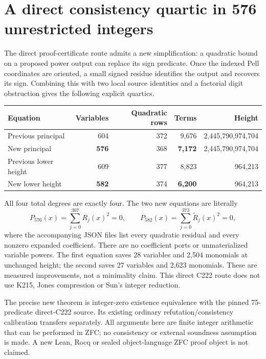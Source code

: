 \section{A direct consistency quartic in 576 unrestricted integers}
\label{sec:direct576}

The direct proof-certificate route admits a new simplification: a
quadratic bound on a proposed power output can replace its sign
predicate.  Once the indexed Pell coordinates are oriented, a small
signed residue identifies the output and recovers its sign.  Combining
this with two local source identities and a factorial digit obstruction
gives the following explicit quartics.

\begin{center}
\begin{tabular}{lrrrr}
\hline
Equation & Variables & Quadratic rows & Terms & Height\\
\hline
Previous principal &604&372&9,676&2,445,790,974,704\\
New principal &\textbf{576}&368&\textbf{7,172}&2,445,790,974,704\\
Previous lower height &609&377&8,823&964,213\\
New lower height &\textbf{582}&374&\textbf{6,200}&964,213\\
\hline
\end{tabular}
\end{center}

All four total degrees are exactly four.  The two new equations are
literally
\[
 P_{576}(x)=\sum_{j=0}^{367}R_j(x)^2=0,
 \qquad
 P_{582}(x)=\sum_{j=0}^{373}\widetilde R_j(x)^2=0,
\]
where the accompanying JSON files list every quadratic residual and
every nonzero expanded coefficient.  There are no coefficient ports or
unmaterialized variable powers.  The first equation saves 28 variables
and 2,504 monomials at unchanged height; the second saves 27 variables
and 2,623 monomials.  These are measured improvements, not a minimality
claim.  This direct C222 route does not use K215, Jones compression or
Sun's integer reduction.

The precise new theorem is integer-zero existence equivalence with the
pinned 75-predicate direct-C222 source.  Its existing ordinary
refutation/consistency calibration transfers separately.  All arguments
here are finite integer arithmetic that can be performed in ZFC; no
consistency or external soundness assumption is made.  A new Lean,
Rocq or sealed object-language ZFC proof object is not claimed.

